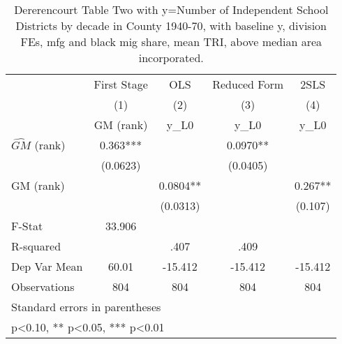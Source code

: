 \begin{table}[htbp]\centering
\def\sym#1{\ifmmode^{#1}\else\(^{#1}\)\fi}
\caption{Dererencourt Table Two with y=Number of Independent School Districts by decade in County 1940-70, with baseline y, division FEs, mfg and black mig share, mean TRI, above median area incorporated.}
\begin{tabular}{l*{4}{c}}
\toprule
                    & First Stage   &         OLS   &Reduced Form   &        2SLS   \\
                    &\multicolumn{1}{c}{(1)}&\multicolumn{1}{c}{(2)}&\multicolumn{1}{c}{(3)}&\multicolumn{1}{c}{(4)}\\
                    &\multicolumn{1}{c}{GM  (rank)}&\multicolumn{1}{c}{y\_L0}&\multicolumn{1}{c}{y\_L0}&\multicolumn{1}{c}{y\_L0}\\
\midrule
$\hat{GM}$ (rank)   &       0.363***&               &      0.0970** &               \\
                    &    (0.0623)   &               &    (0.0405)   &               \\
\addlinespace
GM  (rank)          &               &      0.0804** &               &       0.267** \\
                    &               &    (0.0313)   &               &     (0.107)   \\
\midrule
F-Stat              &      33.906   &               &               &               \\
R-squared           &               &        .407   &        .409   &               \\
Dep Var Mean        &       60.01   &     -15.412   &     -15.412   &     -15.412   \\
Observations        &         804   &         804   &         804   &         804   \\
\bottomrule
\multicolumn{5}{l}{\footnotesize Standard errors in parentheses}\\
\multicolumn{5}{l}{\footnotesize * p<0.10, ** p<0.05, *** p<0.01}\\
\end{tabular}
\end{table}
